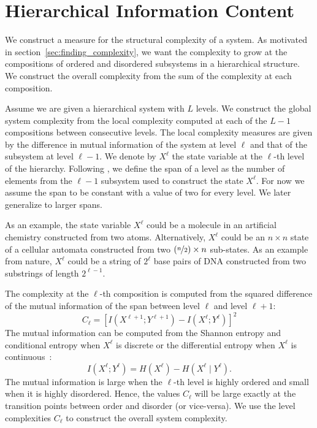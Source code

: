 \section{Hierarchical Information Content}
\label{sec:hic}

We construct a measure for the structural complexity of a system. As motivated
in section~\ref{sec:finding_complexity}, we want the complexity to grow at
the compositions of ordered and disordered subsystems in a hierarchical
structure. We construct the overall complexity from the sum of the complexity at
each composition.

Assume we are given a hierarchical system with $L$ levels. We construct the
global system complexity from the local complexity computed at each of the
$L-1$ compositions between consecutive levels. The local complexity measures
are given by the difference in mutual information of the system at level
$\ell$ and that of the subsystem at level $\ell - 1$. We denote by $X^{\ell}$ the
state variable at the $\ell$-th level of the hierarchy. Following
\citet{simon1991architecture}, we define the span of a level as the
number of elements from the $\ell - 1$ subsystem used to construct the state
$X^\ell$. For now we assume the span to be constant with a value of two for
every level. We later generalize to larger spans.

As an example, the state variable $X^\ell$ could be a molecule in an artificial
chemistry constructed from two atoms. Alternatively, $X^{\ell}$ could be an $n
\times n$ state of a cellular automata constructed from two $(\nicefrac{n}{2})
\times n$ sub-states. As an example from nature, $X^{\ell}$ could be a string
of $2^\ell$ base pairs of DNA constructed from two substrings of length $2^{\ell
- 1}$.

The complexity at the $\ell$-th composition is computed from the squared
difference of the mutual information of the span between level $\ell$ and level
$\ell + 1$:
\begin{equation}
    C_\ell = \left[ I(X^{\ell + 1}; Y^{\ell + 1}) - I(X^{\ell}; Y^{\ell}) \right]^2
\end{equation}
The mutual information can be computed from the Shannon entropy and conditional
entropy when $X^\ell$ is discrete or the differential entropy when $X^\ell$ is
continuous~\citep{cover1999elements}:
\begin{equation}
\label{eq:mutual_information}
I(X^\ell; Y^\ell) = H(X^\ell) - H(X^\ell \mid Y^\ell).
\end{equation}
The mutual information is large when the $\ell$-th level is highly ordered and
small when it is highly disordered. Hence, the values $C_\ell$ will be large
exactly at the transition points between order and disorder (or vice-versa).  We
use the level complexities $C_\ell$ to construct the overall system complexity.

